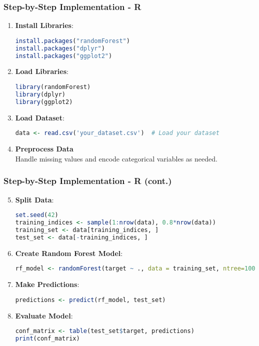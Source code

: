 \documentclass[aspectratio=169]{beamer}
\begin{document}
\begin{frame}[fragile]
    \frametitle{Step-by-Step Implementation - R}
    \begin{enumerate}
        \item \textbf{Install Libraries}:
            \begin{lstlisting}[language=R]
install.packages("randomForest")
install.packages("dplyr")
install.packages("ggplot2")
            \end{lstlisting}

        \item \textbf{Load Libraries}:
            \begin{lstlisting}[language=R]
library(randomForest)
library(dplyr)
library(ggplot2)
            \end{lstlisting}

        \item \textbf{Load Dataset}:
            \begin{lstlisting}[language=R]
data <- read.csv('your_dataset.csv')  # Load your dataset
            \end{lstlisting}

        \item \textbf{Preprocess Data} \\
        Handle missing values and encode categorical variables as needed.
    \end{enumerate}
\end{frame}

\begin{frame}[fragile]
    \frametitle{Step-by-Step Implementation - R (cont.)}
    \begin{enumerate}
        \setcounter{enumi}{4}
        \item \textbf{Split Data}:
            \begin{lstlisting}[language=R]
set.seed(42)
training_indices <- sample(1:nrow(data), 0.8*nrow(data))
training_set <- data[training_indices, ]
test_set <- data[-training_indices, ]
            \end{lstlisting}

        \item \textbf{Create Random Forest Model}:
            \begin{lstlisting}[language=R]
rf_model <- randomForest(target ~ ., data = training_set, ntree=100)  # Training the model
            \end{lstlisting}

        \item \textbf{Make Predictions}:
            \begin{lstlisting}[language=R]
predictions <- predict(rf_model, test_set)
            \end{lstlisting}

        \item \textbf{Evaluate Model}:
            \begin{lstlisting}[language=R]
conf_matrix <- table(test_set$target, predictions)
print(conf_matrix)
            \end{lstlisting}
    \end{enumerate}
\end{frame}
\end{document}

